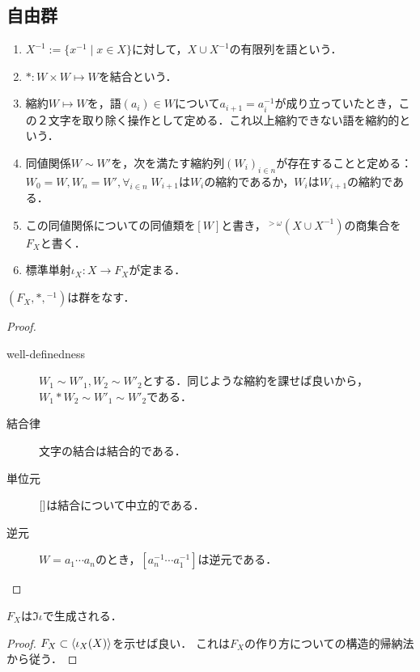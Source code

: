 \documentclass[uplatex,dvipdfmx]{jsreport}
\begin{document}
\subsection{自由群}

\begin{definition}[word]
    \begin{enumerate}
        \item $X^{-1}:=\{x^{-1}\mid x\in X\}$に対して，$X\cup X^{-1}$の有限列を語という．
        \item $*:W\times W\mapsto W$を結合という．
        \item 縮約$W\mapsto W$を，語$(a_i)\in W$について$a_{i+1}=a_i^{-1}$が成り立っていたとき，この２文字を取り除く操作として定める．これ以上縮約できない語を縮約的という．
        \item 同値関係$W\sim W'$を，次を満たす縮約列$(W_i)_{i\in n}$が存在することと定める：$W_0=W,W_n=W',\forall_{i\in n}\;W_{i+1}$は$W_i$の縮約であるか，$W_i$は$W_{i+1}$の縮約である．
        \item この同値関係についての同値類を$[W]$と書き，${}^{>\omega}\!(X\cup X^{-1})$の商集合を$F_X$と書く．
        \item 標準単射$\iota_X:X\to F_X$が定まる．
    \end{enumerate}
\end{definition}

\begin{lemma}
    $(F_X,*,{}^{-1})$は群をなす．
\end{lemma}
\begin{proof}\mbox{}
    \begin{description}
        \item[well-definedness] $W_1\sim W'_1,W_2\sim W'_2$とする．同じような縮約を課せば良いから，$W_1*W_2\sim W'_1\sim W'_2$である．
        \item[結合律] 文字の結合は結合的である．
        \item[単位元] $[\empty]$は結合について中立的である．
        \item[逆元] $W=a_1\cdots a_n$のとき，$[a_n^{-1}\cdots a_1^{-1}]$は逆元である．
    \end{description}
\end{proof}

\begin{lemma}\label{lemma-free-group-in-terms-of-generation}
    $F_X$は$\Im\iota$で生成される．
\end{lemma}
\begin{proof}
    $F_X\subset\langle\iota_X(X)\rangle$を示せば良い．
    これは$F_X$の作り方についての構造的帰納法から従う．
\end{proof}
\end{document}
